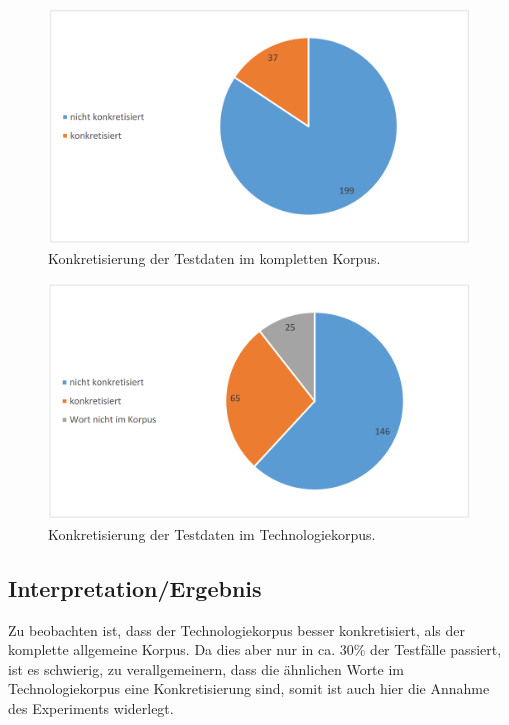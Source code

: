 \documentclass[12pt,a4paper]{report}
\begin{document}
\begin{figure}[p]
  \begin{center}
	\includegraphics[scale=0.4]{KonkretisierungFull.PNG}
  \end{center}  
  \caption{Konkretisierung der Testdaten im kompletten Korpus.}

\end{figure}
\begin{figure}[p]
  \begin{center}
	\includegraphics[scale=0.4]{KonkretisierungTech.PNG}
  \end{center}  
  \caption{Konkretisierung der Testdaten im Technologiekorpus.}
  \end{figure}	
		
		\subsection{Interpretation/Ergebnis}
		Zu beobachten ist, dass der Technologiekorpus besser konkretisiert, als der komplette allgemeine Korpus. Da dies aber nur in ca. 30\% der Testfälle passiert, ist es schwierig, zu verallgemeinern, dass die ähnlichen Worte im Technologiekorpus eine Konkretisierung sind, somit ist auch hier die Annahme des Experiments widerlegt.
		
\end{document}
